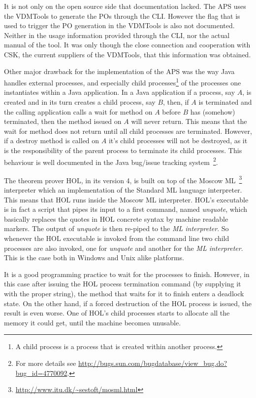 \documentclass[]{article}
\begin{document}
It is not only on the open source side that documentation lacked. 
The APS uses the VDMTools to generate the POs through the CLI.
However the flag that is used to trigger the PO generation in the VDMTools is also not documented.
Neither in the usage information provided through the CLI, nor the actual manual of the tool.
It was only though the close connection and cooperation with CSK, the current suppliers of the VDMTools, that this information was obtained.

Other major drawback for the implementation of the APS was the way Java handles external processes, and especially child processes\footnote{A child process is a process that is created within another process.} of the processes one instantiates within a Java application.
In a Java application if a process, say $A$, is created and in its turn creates a child process, say $B$, then, if $A$ is terminated and the calling application calls a wait for method on $A$ before $B$ has (somehow) terminated, then the method issued on $A$ will never return.
This means that the wait for method does not return until all child processes are terminated.
However, if a destroy method is called on $A$ it's child processes will not be destroyed, as it is the responsibility of the parent process to terminate its child processes.
This behaviour is well documented in the Java bug/issue tracking system~\footnote{For more details see \url{http://bugs.sun.com/bugdatabase/view_bug.do?bug_id=4770092}.}.

The theorem prover HOL, in its version 4, is built on top of the Moscow ML~\footnote{\url{http://www.itu.dk/~sestoft/mosml.html}} interpreter which an implementation of the Standard ML language interpreter.
This means that HOL runs inside the Moscow ML interpreter.
HOL's executable is in fact a script that pipes its input to a first command, named \emph{unquote}, which basically replaces the quotes in HOL concrete syntax by machine readable markers.
The output of \emph{unquote} is then re-piped to the \emph{ML interpreter}.
So whenever the HOL executable is invoked from the command line two child processes are also invoked, one for \emph{unquote} and another for the \emph{ML interpreter}.
This is the case both in Windows and Unix alike platforms.

It is a good programming practice to wait for the processes to finish.
However, in this case after issuing the HOL process termination command (by supplying it with the proper string), the method that waits for it to finish enters a deadlock state.
On the other hand, if a forced destruction of the HOL process is issued, the result is even worse.
One of HOL's child processes starts to allocate all the memory it could get, until the machine becomea unusable.
\end{document}
